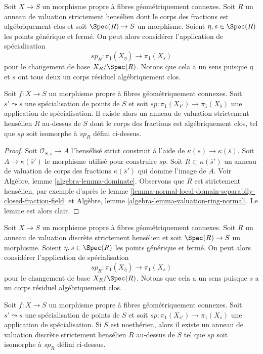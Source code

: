 \noindent
Soit $X \to S$ un morphisme propre à fibres géométriquement connexes.
Soit $R$ un anneau de valuation strictement hensélien dont le corps des fractions
est algébriquement clos et soit $\Spec(R) \to S$
un morphisme. Soient $\eta, s \in \Spec(R)$ les points générique et fermé.
On peut alors considérer l'application de spécialisation
$$
sp_R : \pi_1(X_\eta) \to \pi_1(X_s)
$$
pour le changement de base $X_R/\Spec(R)$. Notons que cela a un sens puisque
$\eta$ et $s$ ont tous deux un corps résiduel algébriquement clos.

\begin{lemma}
\label{lemma-specialization-map-valuation-ring}
Soit $f : X \to S$ un morphisme propre à fibres géométriquement connexes.
Soit $s' \leadsto s$ une spécialisation de points de $S$ et soit
$sp : \pi_1(X_{\overline{s}'}) \to \pi_1(X_{\overline{s}})$
une application de spécialisation. Il existe alors un anneau de valuation strictement hensélien
$R$ au-dessus de $S$ dont le corps des fractions est algébriquement clos,
tel que $sp$ soit isomorphe à $sp_R$ défini ci-dessus.
\end{lemma}

\begin{proof}
Soit $\mathcal{O}_{S, s} \to A$ l'hensélisé strict
construit à l'aide de $\kappa(s) \to \kappa(\overline{s})$.
Soit $A \to \kappa(\overline{s}')$ le morphisme utilisé pour construire $sp$.
Soit $R \subset \kappa(\overline{s}')$ un anneau de valuation de
corps des fractions $\kappa(\overline{s}')$ qui domine l'image de $A$.
Voir Algèbre, lemme \ref{algebra-lemma-dominate}.
Observons que $R$ est strictement hensélien, par exemple d'après le
lemme \ref{lemma-normal-local-domain-separablly-closed-fraction-field}
et Algèbre, lemme \ref{algebra-lemma-valuation-ring-normal}.
Le lemme est alors clair.
\end{proof}

\noindent
Soit $X \to S$ un morphisme propre à fibres géométriquement connexes.
Soit $R$ un anneau de valuation discrète strictement hensélien et soit
$\Spec(R) \to S$ un morphisme. Soient $\eta, s \in \Spec(R)$ les points
générique et fermé. On peut alors considérer l'application de spécialisation
$$
sp_R : \pi_1(X_{\overline{\eta}}) \to \pi_1(X_s)
$$
pour le changement de base $X_R/\Spec(R)$. Notons que cela a un sens puisque $s$
a un corps résiduel algébriquement clos.

\begin{lemma}
\label{lemma-specialization-map-discrete-valuation-ring}
Soit $f : X \to S$ un morphisme propre à fibres géométriquement connexes.
Soit $s' \leadsto s$ une spécialisation de points de $S$ et soit
$sp : \pi_1(X_{\overline{s}'}) \to \pi_1(X_{\overline{s}})$
une application de spécialisation. Si $S$ est noethérien, alors
il existe un anneau de valuation discrète strictement hensélien
$R$ au-dessus de $S$ tel que $sp$ soit isomorphe à $sp_R$
défini ci-dessus.
\end{lemma}

